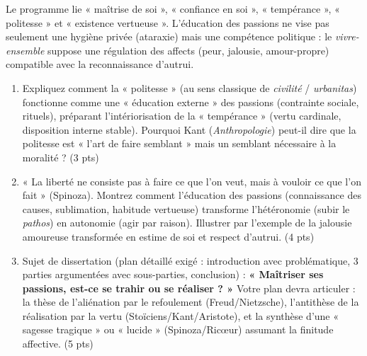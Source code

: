 \documentclass[11pt]{article}
\begin{document}
\begin{exercice}
Le programme lie « maîtrise de soi », « confiance en soi », « tempérance », « politesse » et « existence vertueuse ». L'éducation des passions ne vise pas seulement une hygiène privée (ataraxie) mais une compétence politique : le \textit{vivre-ensemble} suppose une régulation des affects (peur, jalousie, amour-propre) compatible avec la reconnaissance d'autrui.
\begin{enumerate}
    \item Expliquez comment la « politesse » (au sens classique de \textit{civilité} / \textit{urbanitas}) fonctionne comme une « éducation externe » des passions (contrainte sociale, rituels), préparant l'intériorisation de la « tempérance » (vertu cardinale, disposition interne stable). Pourquoi Kant (\textit{Anthropologie}) peut-il dire que la politesse est « l'art de faire semblant » mais un semblant nécessaire à la moralité ? (3 pts)
    \item « La liberté ne consiste pas à faire ce que l'on veut, mais à vouloir ce que l'on fait » (Spinoza). Montrez comment l'éducation des passions (connaissance des causes, sublimation, habitude vertueuse) transforme l'hétéronomie (subir le \textit{pathos}) en autonomie (agir par raison). Illustrer par l'exemple de la jalousie amoureuse transformée en estime de soi et respect d'autrui. (4 pts)
    \item Sujet de dissertation (plan détaillé exigé : introduction avec problématique, 3 parties argumentées avec sous-parties, conclusion) : 
    \textbf{« Maîtriser ses passions, est-ce se trahir ou se réaliser ? »} 
    Votre plan devra articuler : la thèse de l'aliénation par le refoulement (Freud/Nietzsche), l'antithèse de la réalisation par la vertu (Stoïciens/Kant/Aristote), et la synthèse d'une « sagesse tragique » ou « lucide » (Spinoza/Ricœur) assumant la finitude affective. (5 pts)
\end{enumerate}
\end{exercice}
\end{document}
